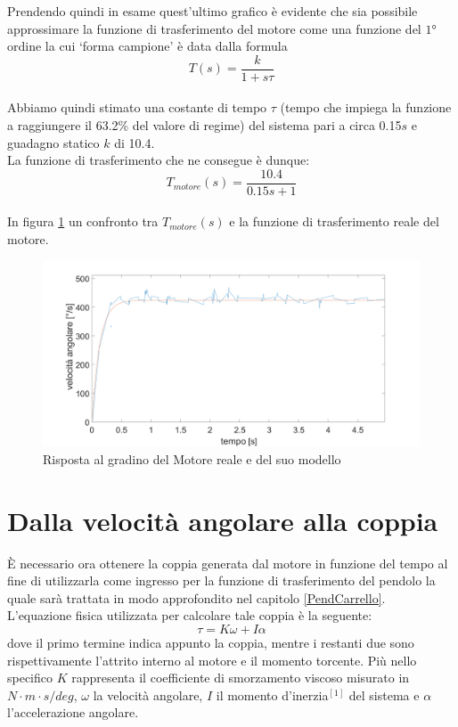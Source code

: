 Prendendo quindi in esame quest'ultimo grafico è evidente che sia possibile approssimare la funzione di trasferimento del motore come una funzione del $\ang{1}$ ordine la cui `forma campione' è data dalla formula $$T(s)=\displaystyle\frac{k}{1+s\tau}$$ \\
Abbiamo quindi stimato una costante di tempo $\tau$ (tempo che impiega la funzione a raggiungere il 63.2\% del valore di regime) del sistema pari a circa 0.15$s$ e guadagno statico $k$ di 10.4.\\
La funzione di trasferimento che ne consegue è dunque:
\\
$$
T_{motore}(s)=\displaystyle\frac{10.4}{0.15s+1}
$$
\\
In figura \ref{modMotorvsReale} un confronto tra $T_{motore}(s)$ e la funzione di trasferimento reale del motore.
\begin{figure}[ht]
	\centering
	\includegraphics[width=\textwidth]{modMotorvsReale.png}
	\caption{Risposta al gradino del Motore reale e del suo modello}
	\label{modMotorvsReale}
\end{figure}

\section{Dalla velocità angolare alla coppia}
È necessario ora ottenere la coppia generata dal motore in funzione del tempo al fine di utilizzarla come ingresso per la funzione di trasferimento del pendolo la quale sarà trattata in modo approfondito nel capitolo \ref{PendCarrello}.\\
L'equazione fisica utilizzata per calcolare tale coppia è la seguente:
$$
\tau=K\omega+I\alpha
$$
dove il primo termine indica appunto la coppia, mentre i restanti due sono rispettivamente l'attrito interno al motore e il momento torcente.
Più nello specifico $K$ rappresenta il coefficiente di smorzamento viscoso misurato in $N\cdot m\cdot s/deg$, $\omega$ la velocità angolare, $I$ il momento d'inerzia$^{[1]}$ del sistema e $\alpha$ l'accelerazione angolare.


